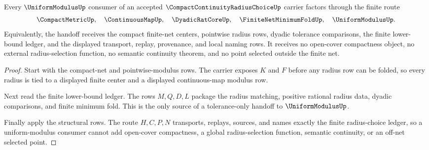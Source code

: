 \begin{theorem}
\label{thm:compact-continuity-radius-choice-uniform-modulus-handoff}
Every $\UniformModulusUp$ consumer of an accepted $\CompactContinuityRadiusChoiceUp$ carrier factors through the finite route
$$
\CompactMetricUp,\quad \ContinuousMapUp,\quad \DyadicRatCoreUp,\quad \FiniteNetMinimumFoldUp,\quad \UniformModulusUp .
$$
Equivalently, the handoff receives the compact finite-net centers, pointwise radius rows, dyadic tolerance comparisons, the finite lower-bound ledger, and the displayed transport, replay, provenance, and local naming rows. It receives no open-cover compactness object, no external radius-selection function, no semantic continuity theorem, and no point selected outside the finite net.
\end{theorem}
\begin{proof}
Start with the compact-net and pointwise-modulus rows. The carrier exposes $K$ and $F$ before any radius row can be folded, so every radius is tied to a displayed finite center and a displayed continuous-map modulus row.

Next read the finite lower-bound ledger. The rows $M,Q,D,L$ package the radius matching, positive rational radius data, dyadic comparisons, and finite minimum fold. This is the only source of a tolerance-only handoff to $\UniformModulusUp$.

Finally apply the structural rows. The route $H,C,P,N$ transports, replays, sources, and names exactly the finite radius-choice ledger, so a uniform-modulus consumer cannot add open-cover compactness, a global radius-selection function, semantic continuity, or an off-net selected point.
\end{proof}




